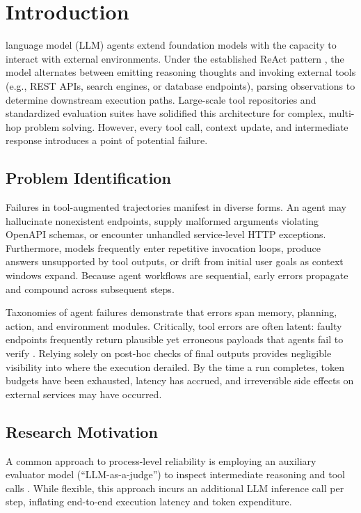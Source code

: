 \documentclass[journal,compsoc]{IEEEtran}
\begin{document}
\section{Introduction}
 language model (LLM) agents extend foundation models with the capacity to interact with external environments. Under the established ReAct pattern \cite{yao2023react}, the model alternates between emitting reasoning thoughts and invoking external tools (e.g., REST APIs, search engines, or database endpoints), parsing observations to determine downstream execution paths. Large-scale tool repositories \cite{qin2024toolllm} and standardized evaluation suites \cite{liu2024agentbench} have solidified this architecture for complex, multi-hop problem solving. However, every tool call, context update, and intermediate response introduces a point of potential failure.

\subsection{Problem Identification}
Failures in tool-augmented trajectories manifest in diverse forms. An agent may hallucinate nonexistent endpoints, supply malformed arguments violating OpenAPI schemas, or encounter unhandled service-level HTTP exceptions. Furthermore, models frequently enter repetitive invocation loops, produce answers unsupported by tool outputs, or drift from initial user goals as context windows expand. Because agent workflows are sequential, early errors propagate and compound across subsequent steps.

Taxonomies of agent failures \cite{zhu2025where, winston2025taxonomy, kokane2024spectool} demonstrate that errors span memory, planning, action, and environment modules. Critically, tool errors are often latent: faulty endpoints frequently return plausible yet erroneous payloads that agents fail to verify \cite{sun2024tools}. Relying solely on post-hoc checks of final outputs provides negligible visibility into where the execution derailed. By the time a run completes, token budgets have been exhausted, latency has accrued, and irreversible side effects on external services may have occurred.

\subsection{Research Motivation}
A common approach to process-level reliability is employing an auxiliary evaluator model (``LLM-as-a-judge'') to inspect intermediate reasoning and tool calls \cite{zheng2023judging, xiang2025guardagent}. While flexible, this approach incurs an additional LLM inference call per step, inflating end-to-end execution latency and token expenditure.
\end{document}
